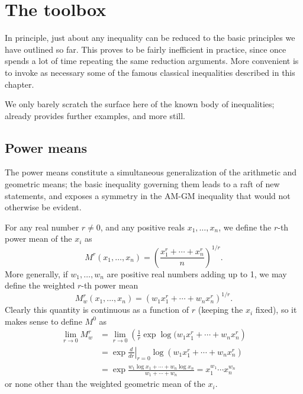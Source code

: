 \documentclass[12pt]{report}
\numberwithin{exc}{section}
\begin{document}
\chapter{The toolbox}
In principle, just about any inequality can be reduced to the basic 
principles we have outlined so far. This proves to be fairly 
inefficient in practice, since once spends a lot of time repeating the 
same reduction arguments. More convenient is to invoke as necessary 
some of the famous classical inequalities described in this chapter.

We only barely scratch the surface here of the known body of 
inequalities; already \cite{bib:ha} provides further 
examples, and \cite{bib:bmv} more still.

\section{Power means}
The power means constitute a simultaneous generalization of the 
arithmetic and geometric means; the basic inequality governing them 
leads to a raft of new statements, and exposes a symmetry in the AM-GM 
inequality that would not otherwise be evident.

For any real number $r \neq 0$, and any positive reals $x_{1}, \dots, 
x_{n}$, we define the $r$-th power mean of the $x_{i}$ as
\[
M^{r}(x_{1}, \dots, x_{n}) = \left( \frac{x_{1}^{r} + \cdots + 
x_{n}^{r}}{n} \right)^{1/r}.
\]
More generally, if $w_{1}, \dots, w_{n}$ are positive real numbers 
adding up to 1, we may define the weighted $r$-th power mean
\[
M^{r}_{w}(x_{1}, \dots, x_{n}) = \left( w_{1} x_{1}^{r} + \cdots + 
w_{n} x_{n}^{r} \right)^{1/r}.
\]
Clearly this quantity is continuous as a function of $r$ (keeping 
the $x_{i}$ fixed), so it makes sense to define $M^{0}$ as
\begin{align*}
\lim_{r \to 0} M^{r}_{w} &=  \lim_{r \to 0} \left( \frac{1}{r} \exp
\log (w_{1} x_{1}^{r} + \cdots + w_{n} x_{n}^{r} \right) \\
 &= \exp \left. \frac{d}{dr} \right|_{r=0}
 \log (w_{1} x_{1}^{r} + \cdots + w_{n} x_{n}^{r} ) \\
 &= \exp \frac{w_{1} \log x_{1} + \cdots + w_{n} \log x_{n}}{w_{1} + 
 \cdots + w_{n}} = x_{1}^{w_{1}} \cdots x_{n}^{w_{n}}
\end{align*}
or none other than the weighted geometric mean of the $x_{i}$.
\end{document}

